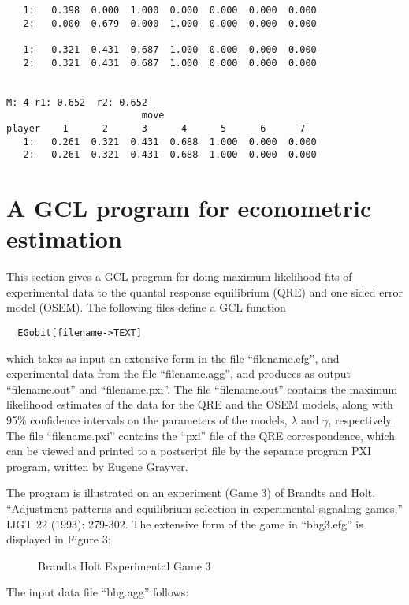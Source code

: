 {\begin{verbatim}
   1:   0.398  0.000  1.000  0.000  0.000  0.000  0.000  
   2:   0.000  0.679  0.000  1.000  0.000  0.000  0.000  

   1:   0.321  0.431  0.687  1.000  0.000  0.000  0.000  
   2:   0.321  0.431  0.687  1.000  0.000  0.000  0.000  


M: 4 r1: 0.652  r2: 0.652
                        move
player    1      2      3      4      5      6      7  
   1:   0.261  0.321  0.431  0.688  1.000  0.000  0.000  
   2:   0.261  0.321  0.431  0.688  1.000  0.000  0.000  
\end{verbatim}
}

\newpage
\section{A GCL program for econometric estimation}  

This section gives a GCL program for doing maximum likelihood fits of
experimental data to the quantal response equilibrium (QRE) and one
sided error model (OSEM).  The following files define a GCL function 

\begin{verbatim}
  EGobit[filename->TEXT] 
\end{verbatim}

\noindent
which takes as input an extensive form in the file ``filename.efg'',
and experimental data from the file ``filename.agg'', and produces as
output ``filename.out'' and ``filename.pxi''.  The file
``filename.out'' contains the maximum likelihood estimates of the data
for the QRE and the OSEM models, along with 95\% confidence intervals
on the parameters of the models, $\lambda$ and $\gamma$, respectively.
The file ``filename.pxi'' contains the ``pxi'' file of the QRE
correspondence, which can be viewed and printed to a postscript file
by the separate program PXI program, written by Eugene Grayver.  

The program is illustrated on an experiment (Game 3) of Brandts and
Holt, ``Adjustment patterns and equilibrium selection in experimental
signaling games,'' IJGT 22 (1993): 279-302.  The extensive form of the
game in ``bhg3.efg'' is displayed in Figure 3:

\begin{figure}[htp]
\centerline{}
\caption{Brandts Holt Experimental Game 3}
\end{figure}

\noindent
The input data file ``bhg.agg'' follows:

